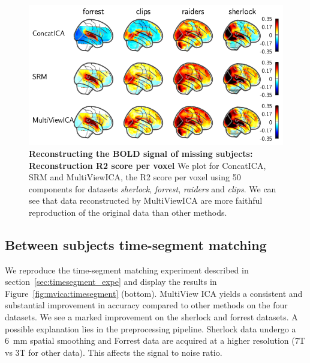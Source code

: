 \begin{figure}
  \centering
  \includegraphics[width=\textwidth]{figures/mvica/reconstruction_score_fullbrain.png}
  \caption{\textbf{Reconstructing the BOLD signal of missing subjects: Reconstruction R2 score per voxel} We plot for ConcatICA, SRM and MultiViewICA, the R2 score per voxel using 50 components for datasets \emph{sherlock}, \emph{forrest}, \emph{raiders} and \emph{clips}. We can see that data reconstructed by MultiViewICA are more faithful reproduction of the original data than other methods.}
  \label{fig:brainmaps}
\end{figure}

%
\subsection{Between subjects time-segment matching} 
We reproduce the time-segment matching experiment described in
section~\ref{sec:timesegment_expe} and display the results in
Figure~\ref{fig:mvica:timesegment} (bottom). 
MultiView ICA yields a consistent and substantial improvement in accuracy compared to other methods on the four datasets. We see a marked improvement on the  sherlock and forrest datasets. A possible explanation lies in the preprocessing pipeline. Sherlock data undergo a 6~mm spatial smoothing and Forrest data are acquired at a higher resolution (7T vs 3T for other data). This affects the signal to noise ratio.
%

